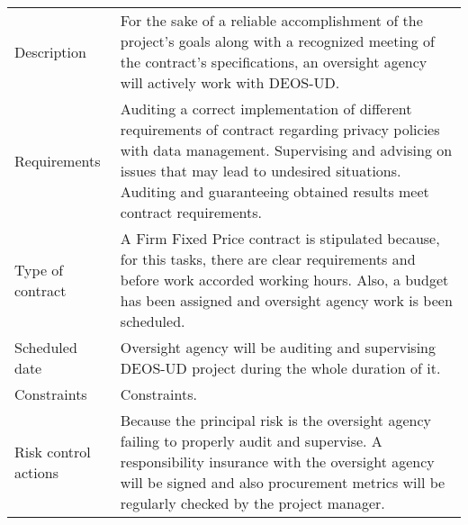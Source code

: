 \begin{table}[H]
	\centering
	\begin{tabular}{>{\raggedright\arraybackslash}p{3cm} >{\arraybackslash}p{11cm}}
		
		\toprule[2pt]
		
		\multicolumn{2}{c}{\textbf{SOW - Auditing}}\\
		
		\midrule[1.5pt]
		
		Description & For the sake of a reliable accomplishment of the project's goals along with a recognized meeting of the contract's specifications, an oversight agency will actively work with DEOS-UD.\vspace{0.2cm} \\
		
		\midrule
		
		Requirements &Auditing a correct implementation of different requirements of contract regarding privacy policies with data management. Supervising and advising on issues that may lead to undesired situations. Auditing and guaranteeing obtained results meet contract requirements.\vspace{0.2cm} \\
		
		\midrule
		
		Type of contract & A Firm Fixed Price contract is stipulated because, for this tasks, there are clear requirements and before work accorded working hours. Also, a budget has been assigned and oversight agency work is been scheduled.\vspace{0.2cm} \\
		
		\midrule
		
		Scheduled date & Oversight agency will be auditing and supervising DEOS-UD project during the whole duration of it.\vspace{0.2cm} \\
		
		\midrule
		
		Constraints & Constraints.\vspace{0.2cm} \\
		
		\midrule
		
		Risk control actions & Because the principal risk is the oversight agency failing to properly audit and supervise. A responsibility insurance with the oversight agency will be signed and also procurement metrics will be regularly checked by the project manager. \vspace{0.2cm} \\
		

\end{tabular}
\end{table}
